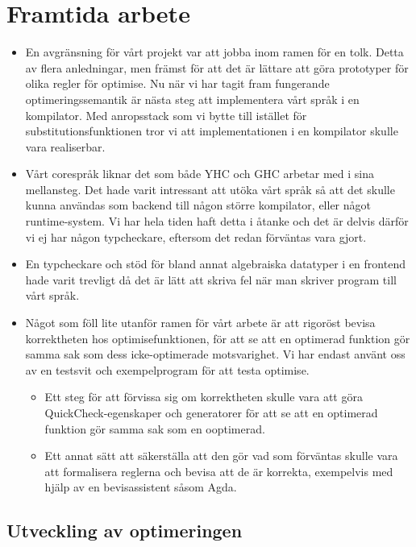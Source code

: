 \documentclass[Rapport]{subfiles}
\begin{document}
\section{Framtida arbete}
\begin{itemize}
\item En avgränsning för vårt projekt var att jobba inom ramen för en tolk. 
Detta av flera anledningar, men främst för att det är lättare att göra prototyper för 
olika regler för optimise. Nu när vi har tagit fram fungerande optimeringssemantik 
är nästa steg att implementera vårt språk i en kompilator.
Med anropsstack som vi bytte till istället för substitutionsfunktionen tror vi att implementationen
i en kompilator skulle vara realiserbar.


\item Vårt corespråk liknar det som både YHC och GHC arbetar med i sina mellansteg.
Det hade varit intressant att utöka vårt språk så att det skulle kunna 
användas som backend till någon större kompilator, eller något runtime-system.
Vi har hela tiden haft detta i åtanke och det är delvis därför vi ej har någon 
typcheckare, eftersom det redan förväntas vara gjort.


\item En typcheckare och stöd för bland annat algebraiska datatyper i en 
frontend hade varit trevligt då det är lätt att skriva fel när man skriver
program till vårt språk. 


\item Något som föll lite utanför ramen för vårt arbete är att rigoröst bevisa
korrektheten hos optimisefunktionen, för att se att en optimerad funktion
gör samma sak som dess icke-optimerade motsvarighet. Vi har endast använt oss av en testsvit
och exempelprogram för att testa optimise. 

\begin{itemize}
\item Ett steg för att förvissa sig om korrektheten skulle vara att göra QuickCheck-egenskaper och generatorer för att se att en optimerad funktion gör samma sak som en ooptimerad. 
\item Ett annat sätt att säkerställa att den
gör vad som förväntas skulle vara att formalisera reglerna och bevisa
att de är korrekta, exempelvis med hjälp av en bevisassistent såsom Agda.
\end{itemize}

\end{itemize}
\subsection{Utveckling av optimeringen}
\end{document}

